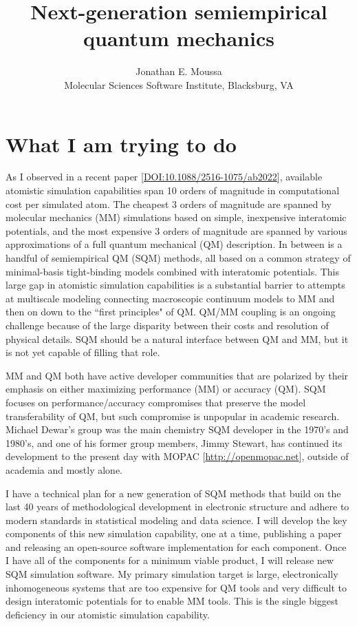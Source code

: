 \documentclass[12pt]{article}
\title{\vspace{-0.58in}Next-generation semiempirical quantum mechanics\vspace{-0.1in}}
\author{Jonathan E. Moussa \\ Molecular Sciences Software Institute, Blacksburg, VA\vspace{-0.2in}}
\date{}
\begin{document}
\maketitle

\section{What I am trying to do}

As I observed in a recent paper [\href{https://doi.org/10.1088/2516-1075/ab2022}{DOI:10.1088/2516-1075/ab2022}],
 available atomistic simulation capabilities span 10 orders of magnitude in computational cost per simulated atom.
The cheapest 3 orders of magnitude are spanned by molecular mechanics (MM) simulations based on simple, inexpensive interatomic potentials,
 and the most expensive 3 orders of magnitude are spanned by various approximations of a full quantum mechanical (QM) description.
In between is a handful of semiempirical QM (SQM) methods, all based on a common strategy of minimal-basis tight-binding models combined with interatomic potentials.
This large gap in atomistic simulation capabilities is a substantial barrier to attempts at multiscale modeling
 connecting macroscopic continuum models to MM and then on down to the ``first principles" of QM.
QM/MM coupling is an ongoing challenge because of the large disparity between their costs and resolution of physical details.
SQM should be a natural interface between QM and MM, but it is not yet capable of filling that role.

MM and QM both have active developer communities that are polarized by their emphasis on either maximizing performance (MM) or accuracy (QM).
SQM focuses on performance/accuracy compromises that preserve the model transferability of QM, but such compromise is unpopular in academic research.
Michael Dewar's group was the main chemistry SQM developer in the 1970's and 1980's,
 and one of his former group members, Jimmy Stewart, has continued its development to the present day with MOPAC [\href{http://openmopac.net}{http://openmopac.net}],
 outside of academia and mostly alone.

I have a technical plan for a new generation of SQM methods that build on the last 40 years of methodological development in electronic structure
 and adhere to modern standards in statistical modeling and data science.
I will develop the key components of this new simulation capability, one at a time,
 publishing a paper and releasing an open-source software implementation for each component.
Once I have all of the components for a minimum viable product,
 I will release new SQM simulation software.
My primary simulation target is large, electronically inhomogeneous systems
 that are too expensive for QM tools
 and very difficult to design interatomic potentials for to enable MM tools.
This is the single biggest deficiency in our atomistic simulation capability.
\end{document}
